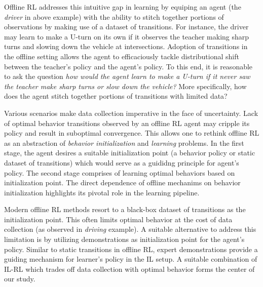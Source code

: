 \documentclass{article}
\begin{document}
Offline RL addresses this intuitive gap in learning by equiping an agent (the \textit{driver} in above example) with the ability to stitch together portions of observations by making use of a dataset of transitions. For instance, the driver may learn to make a U-turn on its own if it observes the teacher making sharp turns and slowing down the vehicle at intersections. Adoption of transitions in the offline setting allows the agent to efficaciously tackle distributional shift between the teacher's policy and the agent's policy. To this end, it is reasonable to ask the question \textit{how would the agent learn to make a U-turn if it never saw the teacher make sharp turns or slow down the vehicle?} More specifically, how does the agent stitch together portions of transitions with limited data?

Various scenarios make data collection imperative in the face of uncertainty. Lack of optimal behavior transitions observed by an offline RL agent may cripple its policy and result in suboptimal convergence. This allows one to rethink offline RL as an abstraction of \textit{behavior initialization} and \textit{learning} problems. In the first stage, the agent desires a suitable initialization point (a behavior policy or static dataset of transitions) which would serve as a guididng principle for agent's policy. The second stage comprises of learning optimal behaviors based on initialization point. The direct dependence of offline mechanims on behavior initialization highlights its pivotal role in the learning pipeline.

Modern offline RL methods resort to a black-box dataset of transitions as the initialization point. This often limits optimal behavior at the cost of data collection (as observed in \textit{driving} example). A suitable alternative to address this limitation is by utilizing demonstrations as initialization point for the agent's policy. Similar to static transitions in offline RL, expert demonstrations provide a guiding mechanism for learner's policy in the IL setup. A suitable combination of IL-RL which trades off data collection with optimal behavior forms the center of our study. 

\end{document}
